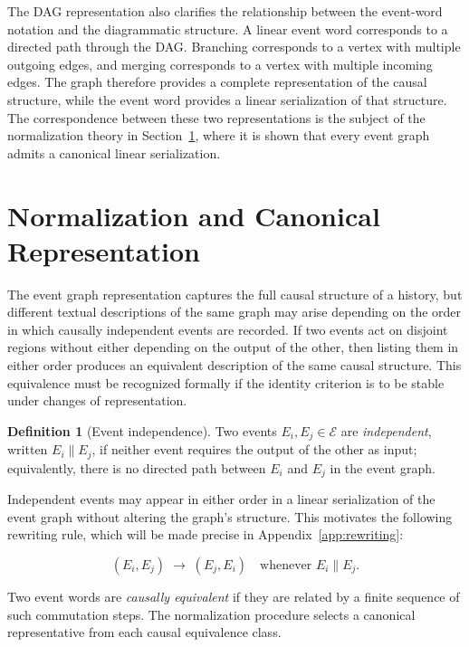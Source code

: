 \documentclass[12pt]{article}
\theoremstyle{plain}
\theoremstyle{definition}
\newtheorem{definition}[theorem]{Definition}
\theoremstyle{remark}
\begin{document}
The DAG representation also clarifies the relationship between the event-word
notation and the diagrammatic structure.  A linear event word corresponds to a
directed path through the DAG.  Branching corresponds to a vertex with multiple
outgoing edges, and merging corresponds to a vertex with multiple incoming
edges.  The graph therefore provides a complete representation of the causal
structure, while the event word provides a linear serialization of that
structure.  The correspondence between these two representations is the subject
of the normalization theory in Section~\ref{sec:normalization}, where it is
shown that every event graph admits a canonical linear serialization.


\section{Normalization and Canonical Representation}
\label{sec:normalization}

The event graph representation captures the full causal structure of a history,
but different textual descriptions of the same graph may arise depending on
the order in which causally independent events are recorded.  If two events
act on disjoint regions without either depending on the output of the other,
then listing them in either order produces an equivalent description of the
same causal structure.  This equivalence must be recognized formally if the
identity criterion is to be stable under changes of representation.

\begin{definition}[Event independence]
Two events $E_i, E_j \in \mathcal{E}$ are \emph{independent}, written
$E_i \parallel E_j$, if neither event requires the output of the other as
input; equivalently, there is no directed path between $E_i$ and $E_j$ in the
event graph.
\end{definition}

Independent events may appear in either order in a linear serialization of the
event graph without altering the graph's structure.  This motivates the
following rewriting rule, which will be made precise in Appendix~\ref{app:rewriting}:

\[
  (E_i, E_j) \;\longrightarrow\; (E_j, E_i)
  \quad \text{whenever } E_i \parallel E_j.
\]

Two event words are \emph{causally equivalent} if they are related by a finite
sequence of such commutation steps.  The normalization procedure selects a
canonical representative from each causal equivalence class.
\end{document}
